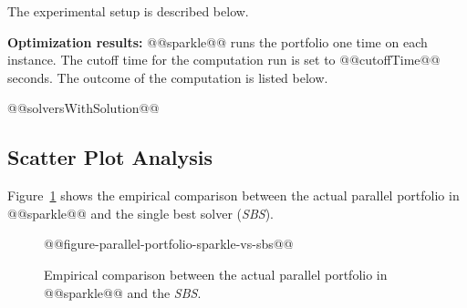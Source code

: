 \documentclass[british]{article}
\newif\ifdes
\begin{document}
The experimental setup is described below.

\ifdes \textbf{Performance computation:} @@sparkle@@ runs the portfolio one time on each instance. The cutoff time for the computation run is set to @@cutoffTime@@ seconds. The outcome of the computation is listed below. The scores of the outcomes are calculated according to PAR10, this means that for each instance the solver which solved the instance is scored its runtime and the remaining solvers are scored the runtime times ten. If however the portfolio reaches the cutofftime, which means that no solvers solved the instance, all solvers are scored the cutofftime times ten.
\else \textbf{Optimization results:} @@sparkle@@ runs the portfolio one time on each instance. The cutoff time for the computation run is set to @@cutoffTime@@ seconds. The outcome of the computation is listed below. \fi

\begin{enumerate}
@@solversWithSolution@@
\end{enumerate}
\ifdes
In the table below the computed PAR10 scores of all solvers have been listed aswell as the portfolio itself.
\begin{table}[h]
@@resultsTable@@
\end{table}
\fi
\subsection{Scatter Plot Analysis}
\label{sec:Scatter_Plot_Analysis}

Figure~\ref{fig:sparkle_vs_sbs} shows the empirical comparison between the actual parallel portfolio in @@sparkle@@ and the single best solver (\emph{SBS}).

% 

\begin{figure}[htbp]
\noindent \begin{centering}
    @@figure-parallel-portfolio-sparkle-vs-sbs@@
\par\end{centering}

\caption{Empirical comparison between the actual parallel portfolio in @@sparkle@@ and the \emph{SBS}.}\label{fig:sparkle_vs_sbs}
\end{figure}



\end{document}
